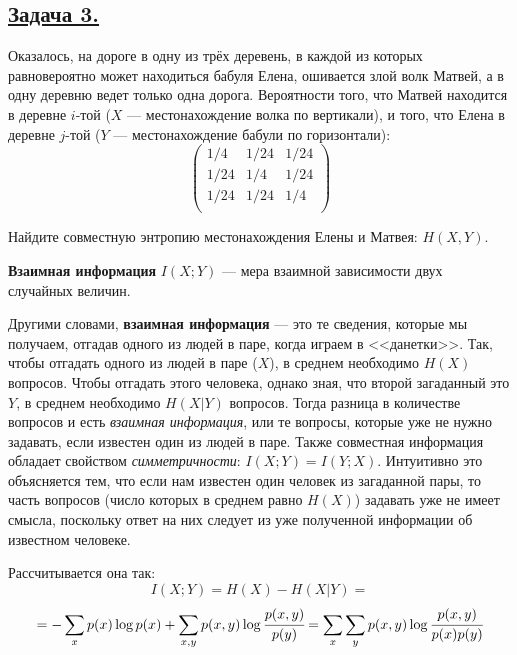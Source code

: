 \subsection*{\hyperref[sec:sol_problem3]{Задача 3.}}\label{sec:problem3} Оказалось, на дороге в одну из трёх деревень, в каждой из которых равновероятно может находиться бабуля Елена, ошивается злой волк Матвей, а в одну деревню ведет только одна дорога. Вероятности того, что Матвей находится в деревне $i$-той ($X$ --- местонахождение волка по вертикали), и того, что Елена в деревне $j$-той ($Y$ --- местонахождение бабули по горизонтали):
\[\begin{pmatrix}
    1/4 & 1/24 & 1/24 \\
    1/24 & 1/4 & 1/24 \\
    1/24 & 1/24 & 1/4 \\
\end{pmatrix} \]

Найдите совместную энтропию местонахождения Елены и Матвея: $H(X, Y)$. \\


\begin{siderules}
    \textbf{Взаимная информация} $I(X; Y)$ --- мера взаимной зависимости двух случайных величин.
\end{siderules}

Другими словами, \textbf{взаимная информация} --- это те сведения, которые мы получаем, отгадав одного из людей в паре, когда играем в <<данетки>>. Так, чтобы отгадать одного из людей в паре ($X$), в среднем необходимо $H(X)$ вопросов. Чтобы отгадать этого человека, однако зная, что второй загаданный это $Y$, в среднем необходимо $H(X|Y)$ вопросов. Тогда разница в количестве вопросов и есть \textit{взаимная информация}, или те вопросы, которые уже не нужно задавать, если известен один из людей в паре. Также совместная информация обладает свойством \textit{симметричности}: $I(X;Y)=I(Y;X)$. Интуитивно это объясняется тем, что если нам известен один человек из загаданной пары, то часть вопросов (число которых в среднем равно $H(X)$) задавать уже не имеет смысла, поскольку ответ на них следует из уже полученной информации об известном человеке. 

Рассчитывается она так:
\[I(X; Y)=H(X)-H(X|Y)=\]
\[=-\sum\limits_{x} p(x)\log p(x) +\sum\limits_{x, y} p(x, y)\log \cfrac{p(x, y)}{p(y)} =
\sum\limits_{x}\sum\limits_{y} p(x, y)\log \cfrac{p(x, y)}{p(x)p(y)} \]

